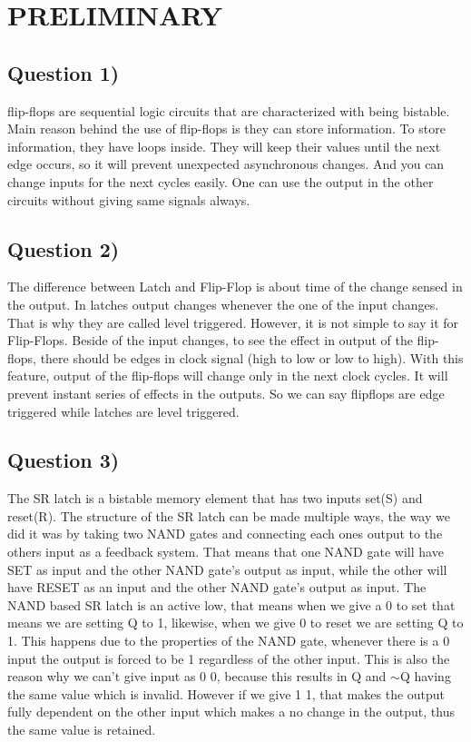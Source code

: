 \documentclass[pdftex,12pt,a4paper]{article}
\begin{document}
\section{PRELIMINARY}

\subsection{Question 1)}
flip-flops are sequential logic circuits that are characterized with being bistable. Main reason behind the use of flip-flops is they can store information. To store information, they have loops inside. They will keep their values until the next edge occurs, so it will prevent unexpected asynchronous changes. And you can change inputs for the next cycles easily. One can use the output in the other circuits without giving same signals always.


\subsection{Question 2)}
The difference between Latch and Flip-Flop is about time of the change sensed in the output. In latches output changes whenever the one of the input changes. That is why they are called level triggered. However, it is not simple to say it for Flip-Flops. Beside of the input changes, to see the effect in output of the flip-flops, there should be edges in clock signal (high to low or low to high). With this feature, output of the flip-flops will change only in the next clock cycles. It will prevent instant series of effects in the outputs. So we can say flipflops are edge triggered while latches are level triggered.

\subsection{Question 3)}
The SR latch is a bistable memory element that has two inputs set(S) and reset(R). The structure of the SR latch can be made multiple ways, the way we did it was by taking two NAND gates and connecting each ones output to the others input as a feedback system. That means that one NAND gate will have SET as input and the other NAND gate's output as input, while the other will have RESET as an input and the other NAND gate's output as input. The NAND based SR latch is an active low, that means when we give a 0 to set that means we are setting Q to 1, likewise, when we give 0 to reset we are setting Q to 1. This happens due to the properties of the NAND gate, whenever there is a 0 input the output is forced to be 1 regardless of the other input. This is also the reason why  we can't give input as 0 0, because this results in Q and $\sim$Q having the same value which is invalid. However if we give 1 1, that makes the output fully dependent on the other input which makes a no change in the output, thus the same value is retained.
\end{document}
